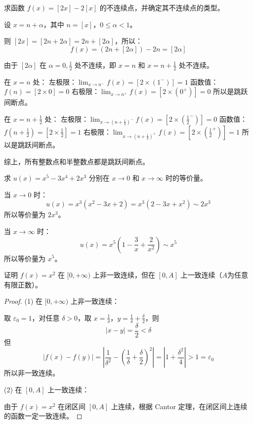 \documentclass[lang=cn,12pt]{elegantbook}
\begin{document}
\begin{example}
求函数 $f(x) = [2x] - 2[x]$ 的不连续点，并确定其不连续点的类型。
\end{example}

\begin{solution}
设 $x = n + \alpha$，其中 $n = [x]$，$0 \leq \alpha < 1$。

则 $[2x] = [2n + 2\alpha] = 2n + [2\alpha]$，所以：
\[
f(x) = (2n + [2\alpha]) - 2n = [2\alpha]
\]

由于 $[2\alpha]$ 在 $\alpha = 0, \frac{1}{2}$ 处不连续，即 $x = n$ 和 $x = n + \frac{1}{2}$ 处不连续。

在 $x = n$ 处：
左极限：$\lim_{x \to n^-} f(x) = [2 \times (1^-)] = 1$
函数值：$f(n) = [2 \times 0] = 0$
右极限：$\lim_{x \to n^+} f(x) = [2 \times (0^+)] = 0$
所以是跳跃间断点。

在 $x = n + \frac{1}{2}$ 处：
左极限：$\lim_{x \to (n+\frac{1}{2})^-} f(x) = [2 \times (\frac{1}{2}^-)] = 0$
函数值：$f(n+\frac{1}{2}) = [2 \times \frac{1}{2}] = 1$
右极限：$\lim_{x \to (n+\frac{1}{2})^+} f(x) = [2 \times (\frac{1}{2}^+)] = 1$
所以是跳跃间断点。

综上，所有整数点和半整数点都是跳跃间断点。
\end{solution}

\begin{example}
求 $u(x) = x^5 - 3x^4 + 2x^3$ 分别在 $x \to 0$ 和 $x \to \infty$ 时的等价量。
\end{example}

\begin{solution}
当 $x \to 0$ 时：
\[
u(x) = x^3(x^2 - 3x + 2) = x^3(2 - 3x + x^2) \sim 2x^3
\]
所以等价量为 $2x^3$。

当 $x \to \infty$ 时：
\[
u(x) = x^5\left(1 - \frac{3}{x} + \frac{2}{x^2}\right) \sim x^5
\]
所以等价量为 $x^5$。
\end{solution}

\begin{example}
证明 $f(x) = x^2$ 在 $[0,+\infty)$ 上非一致连续，但在 $[0,A]$ 上一致连续（$A$为任意有限正数）。
\end{example}

\begin{proof}
(1) 在 $[0,+\infty)$ 上非一致连续：

取 $\varepsilon_0 = 1$，对任意 $\delta > 0$，取 $x = \frac{1}{\delta}$，$y = \frac{1}{\delta} + \frac{\delta}{2}$，则
\[
|x - y| = \frac{\delta}{2} < \delta
\]
但
\[
|f(x) - f(y)| = \left|\frac{1}{\delta^2} - \left(\frac{1}{\delta} + \frac{\delta}{2}\right)^2\right| = \left|1 + \frac{\delta^2}{4}\right| > 1 = \varepsilon_0
\]
所以非一致连续。

(2) 在 $[0,A]$ 上一致连续：

由于 $f(x) = x^2$ 在闭区间 $[0,A]$ 上连续，根据 Cantor 定理，在闭区间上连续的函数一定一致连续。
\end{proof}
\end{document}
